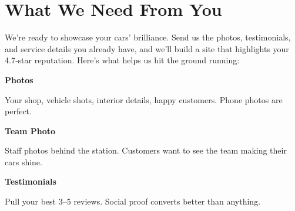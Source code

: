 \documentclass[11pt,letterpaper]{article}
\begin{document}
\vspace{0.2em}

\section*{What We Need From You}

We’re ready to showcase your cars’ brilliance. Send us the photos, testimonials, and service details you already have, and we’ll build a site that highlights your 4.7‑star reputation. Here’s what helps us hit the ground running:

\vspace{0.12em}

\noindent\begin{minipage}[t]{0.48\textwidth}
\begin{tcolorbox}[colframe=accent-teal, boxrule=1pt, left=0.7em, right=0.7em, top=0.5em, bottom=0.5em, arc=4pt, boxsep=0pt]
{\bfseries\small\color{accent-teal}Photos}

\vspace{0.15em}

{\small Your shop, vehicle shots, interior details, happy customers. Phone photos are perfect.}
\end{tcolorbox}

\vspace{0.1em}

\begin{tcolorbox}[colframe=accent-teal, boxrule=1pt, left=0.7em, right=0.7em, top=0.5em, bottom=0.5em, arc=4pt, boxsep=0pt]
{\bfseries\small\color{accent-teal}Team Photo}

\vspace{0.15em}

{\small Staff photos behind the station. Customers want to see the team making their cars shine.}
\end{tcolorbox}

\vspace{0.1em}

\begin{tcolorbox}[colframe=accent-teal, boxrule=1pt, left=0.7em, right=0.7em, top=0.5em, bottom=0.5em, arc=4pt, boxsep=0pt]
{\bfseries\small\color{accent-teal}Testimonials}

\vspace{0.15em}

{\small Pull your best 3--5 reviews. Social proof converts better than anything.}
\end{tcolorbox}
\end{minipage}
\end{document}

